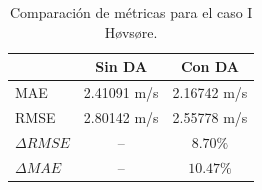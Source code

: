 \begin{table}[H]
	\caption{Comparación de métricas para el caso I Høvsøre.}
	\label{tab:06_hov_mae_rmse}
	\centering%
	\begin{tabular}{lcc}
		\toprule
		& Sin DA & Con DA \\
		\midrule
		MAE & 2.41091 m/s & 2.16742 m/s \\
		RMSE & 2.80142 m/s& 2.55778 m/s\\
		$\Delta{RMSE}$& --  & $8.70\%$  \\
		$\Delta{MAE}$ & -- & $10.47\%$  \\
		\bottomrule
	\end{tabular}
\end{table}